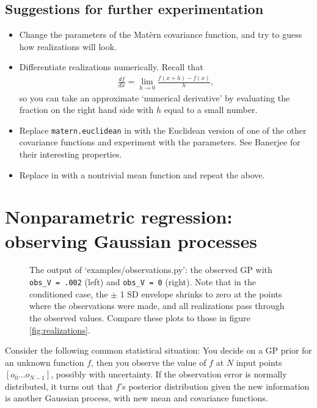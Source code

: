 \subsection{Suggestions for further experimentation}
\label{sec:experiment}


\begin{itemize}
    \item Change the parameters of the Mat\`ern covariance function, and try to guess how realizations will look.
    \item Differentiate realizations numerically. Recall that
    \begin{eqnarray*}
        \frac{df}{dx}=\lim_{h\rightarrow 0} \frac{f(x+h)-f(x)}{h},
    \end{eqnarray*}
    so you can take an approximate `numerical derivative' by evaluating the fraction on the right hand side with $h$ equal to a small number.
    \item Replace \texttt{matern.euclidean} in  with the Euclidean version of one of the other covariance functions and experiment with the parameters. See Banerjee \cite{banerjee} for their interesting properties.
    \item Replace  in  with a nontrivial mean function and repeat the above.
\end{itemize}

\section{Nonparametric regression: observing Gaussian processes}\label{sec:observing}

\begin{figure}
    \centering
    \caption{The output of {\sffamily `examples/observations.py'}: the observed GP with \texttt{obs_V = .002} (left) and \texttt{obs_V = 0} (right). Note that in the conditioned case, the $\pm$ 1 SD envelope shrinks to zero at the points where the observations were made, and all realizations pass through the observed values. Compare these plots to those in figure \ref{fig:realizations}.}
    \label{fig:obs}
\end{figure}

Consider the following common statistical situation: You decide on a GP prior for an unknown function $f$, then you observe the value of $f$ at $N$ input points $[o_0\ldots o_{N-1}]$, possibly with uncertainty. If the observation error is normally distributed, it turns out that $f$'s posterior distribution given the new information is another Gaussian process, with new mean and covariance functions.

